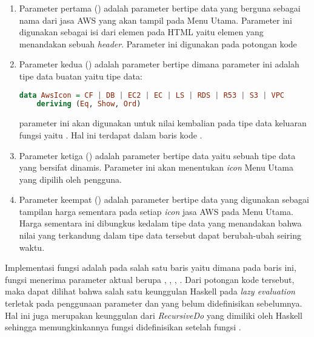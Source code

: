 \documentclass[pi.tex]{subfile}
\begin{document}
\begin{enumerate}[leftmargin=1.65cm]
\item Parameter pertama () adalah parameter bertipe data  yang berguna sebagai nama dari jasa AWS yang akan tampil pada Menu Utama. Parameter ini digunakan sebagai isi dari elemen  pada HTML yaitu elemen yang menandakan sebuah \emph{header}. Parameter ini digunakan pada potongan kode 
\item Parameter kedua () adalah parameter bertipe  dimana parameter ini adalah tipe data buatan yaitu tipe data:\\
  \begin{lstlisting}[language=Haskell]
    data AwsIcon = CF | DB | EC2 | EC | LS | RDS | R53 | S3 | VPC
    deriving (Eq, Show, Ord)
  \end{lstlisting}
  parameter  ini akan digunakan untuk nilai kembalian pada tipe data keluaran fungsi  yaitu . Hal ini terdapat dalam baris kode .
\item Parameter ketiga  () adalah parameter bertipe data  yaitu sebuah tipe data  yang bersifat dinamis. Parameter ini akan menentukan \emph{icon} Menu Utama yang dipilih oleh pengguna.

\item Parameter keempat () adalah parameter bertipe data  yang digunakan sebagai tampilan harga sementara pada setiap \emph{icon} jasa AWS pada Menu Utama. Harga sementara ini dibungkus kedalam tipe data  yang menandakan bahwa nilai yang terkandung dalam tipe data tersebut dapat berubah-ubah seiring waktu.
\end{enumerate}

\hspace{10pt}Implementasi fungsi  adalah pada salah satu baris yaitu  dimana pada baris ini, fungsi  menerima parameter aktual berupa , , , . Dari potongan kode tersebut, maka dapat dilihat bahwa salah satu keunggulan Haskell pada \emph{lazy evaluation} terletak pada penggunaan parameter  dan  yang belum didefinisikan sebelumnya. Hal ini juga merupakan keunggulan dari \emph{RecursiveDo} yang dimiliki oleh Haskell sehingga memungkinkannya fungsi  didefinisikan setelah fungsi .
\end{document}
